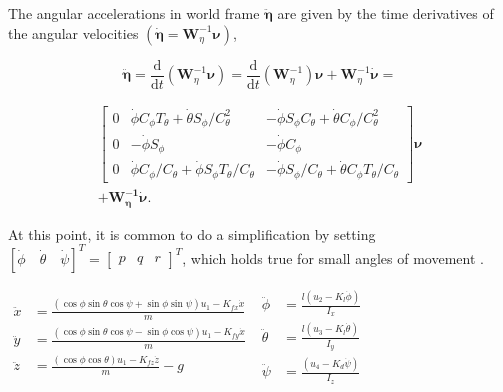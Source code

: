 The angular accelerations in world frame $\ddot{\boldsymbol{\eta}}$ are given by the time derivatives of the angular velocities $\left(\dot{\boldsymbol{\eta}} = \boldsymbol{W}_{\eta}^{-1} \boldsymbol{\nu}\right)$,

$$\ddot{\boldsymbol{\eta}}=\frac{\mathrm{d}}{\mathrm{d} t}\left(\boldsymbol{W}_{\eta}^{-1} \boldsymbol{\nu}\right) =\frac{\mathrm{d}}{\mathrm{d} t}\left(\boldsymbol{W}_{\eta}^{-1}\right) \boldsymbol{\nu}+\boldsymbol{W}_{\eta}^{-1} \dot{\boldsymbol{\nu}} = $$

$$
\begin{array}{c}
\left[ \begin{array}{cccc}{0} & {\dot{\phi} C_{\phi} T_{\theta}+\dot{\theta} S_{\phi} / C_{\theta}^{2}} & {-\dot{\phi} S_{\phi} C_{\theta}+\dot{\theta} C_{\phi} / C_{\theta}^{2}} \\ {0} & {-\dot{\phi} S_{\phi}} & {-\dot{\phi} C_{\phi}} \\ {0} & {\dot{\phi} C_{\phi} / C_{\theta}+\dot{\phi} S_{\phi} T_{\theta} / C_{\theta}} & {-\dot{\phi} S_{\phi} / C_{\theta}+\dot{\theta} C_{\phi} T_{\theta} / C_{\theta}}\end{array}\right] \boldsymbol{\nu}
\\ + \boldsymbol{W_{\eta}^{-1}} \dot{\boldsymbol{\nu}}.
\end{array}
  $$

At this point, it is common to do a simplification by setting $[\dot{\phi} \quad \dot{\theta} \quad \dot{\psi}]^{T}=\left[ \begin{array}{lll}{p} & {q} & {r}\end{array}\right]^{T}$, which holds true for small angles of movement \cite{Sabatino}.

$\begin{aligned} \ddot{x} &=\frac{(\cos \phi \sin \theta \cos \psi+\sin \phi \sin \psi) u_{1}-K_{f x} \dot{x}}{m} \\ \ddot{y} &=\frac{(\cos \phi \sin \theta \cos \psi-\sin \phi \cos \psi) u_{1}-K_{f y} \dot{x}}{m} \\ \ddot{z} &=\frac{(\cos \phi \cos \theta) u_{1}-K_{f z} \dot{z}}{m}-g \end{aligned}$
$\begin{aligned} \ddot{\phi} &=\frac{l\left(u_{2}-K_{l} \dot{\phi}\right)}{I_{x}} \\ \ddot{\theta} &=\frac{l\left(u_{3}-K_{l} \dot{\theta}\right)}{I_{y}} \\ \ddot{\psi} &=\frac{\left(u_{4}-K_{d} \dot{\psi}\right)}{I_{z}} \end{aligned}$

